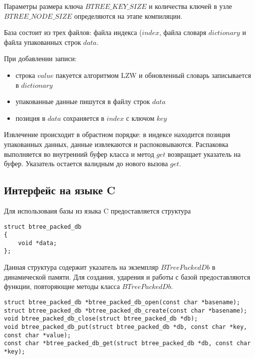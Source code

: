 \documentclass[14pt, russian]{scrartcl}
\begin{document}
Параметры размера ключа $BTREE\_KEY\_SIZE$ и количества ключей в узле $BTREE\_NODE\_SIZE$ определяются на этапе компиляции.

База состоит из трех файлов: файла индекса ($index$, файла словаря $dictionary$ и файла упакованных строк $data$. 

При добавлении записи:

\begin{itemize}
    \item строка $value$ пакуется алгоритмом LZW и обновленный словарь записывается в $dictionary$
    \item упакованные данные пишутся в файлу строк $data$
    \item позиция в $data$ сохраняется в $index$ с ключом $key$
\end{itemize}

Извлечение происходит в обрастном порядке: в индексе находится позиция упакованных данных, данные извлекаются и распоковываются. Распаковка выполняется во внутренний буфер класса и метод $get$ возвращает указатель на буфер. Указатель остается валидным до нового вызова $get$.

\subsection{Интерфейс на языке C}

Для использоваия базы из языка C предоставляется структура 

\begin{verbatim}
struct btree_packed_db
{
    void *data;
};
\end{verbatim}

Данная структура содержит указатель на экземпляр $BTreePackedDb$ в динамической памяти. Для создания, ударения и работы с базой предоставляются функции, повторяющие методы класса $BTreePackedDb$.

\begin{verbatim}
struct btree_packed_db *btree_packed_db_open(const char *basename);
struct btree_packed_db *btree_packed_db_create(const char *basename);
void btree_packed_db_close(struct btree_packed_db *db);
void btree_packed_db_put(struct btree_packed_db *db, const char *key, const char *value);
const char *btree_packed_db_get(struct btree_packed_db *db, const char *key);
\end{verbatim}
\end{document}
